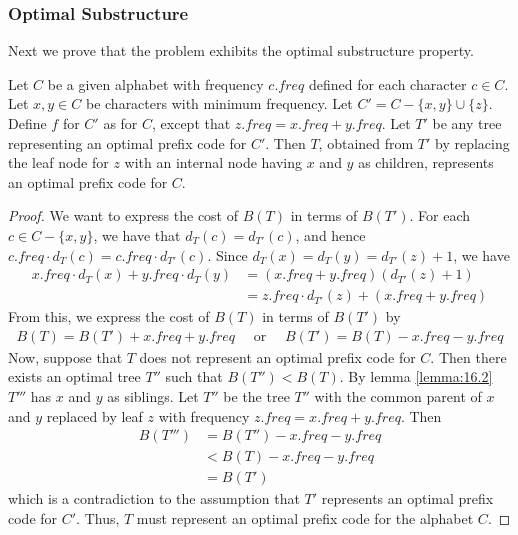 \subsubsection{Optimal Substructure}
Next we prove that the problem exhibits the optimal substructure property.
\begin{lemma} \cite[16.3, p. 435]{clrs}
\textnormal
{
	Let $C$ be a given alphabet with frequency $c.freq$ defined for each
	character $c \in C$. Let $x, y \in C$ be characters with minimum frequency.
	Let $C' = C - \{x, y\} \cup \{z\}$. Define $f$ for $C'$ as for $C$, except
	that $z.freq = x.freq + y.freq$. Let $T'$ be any tree representing an
	optimal prefix code for $C'$. Then $T$, obtained from $T'$ by replacing
	the leaf node for $z$ with an internal node having $x$ and $y$ as children,
	represents an optimal prefix code for $C$.
}
\end{lemma}

\begin{proof}
	We want to express the cost of $B(T)$ in terms of $B(T')$. For each $c \in
	C - \{x, y\}$, we have that $d_T(c) = d_{T'}(c)$, and hence $c.freq \cdot
	d_T(c) = c.freq \cdot d_{T'}(c)$. Since $d_T(x) = d_T(y) = d_{T'}(z) + 1$,
	we have
	\begin{align}
		x.freq \cdot d_T(x) + y.freq \cdot d_T(y)
		&= (x.freq + y.freq)(d_{T'}(z) + 1) \\
		&= z.freq \cdot d_{T'}(z) + (x.freq + y.freq)
	\end{align}
	From this, we express the cost of $B(T)$ in terms of $B(T')$ by
	\begin{align}
		B(T) = B(T') + x.freq + y.freq
		\quad \text{ or } \quad
		B(T') = B(T) - x.freq - y.freq
	\end{align}
	Now, suppose that $T$ does not represent an optimal prefix code for $C$.
	Then there exists an optimal tree $T''$ such that $B(T'') < B(T)$. By
	lemma \ref{lemma:16.2} $T'''$ has $x$ and $y$ as siblings. Let $T''$ be
	the tree $T''$ with the common parent of $x$ and $y$ replaced by leaf $z$
	with frequency $z.freq = x.freq + y.freq$. Then
	\begin{align}
		B(T''') &= B(T'') - x.freq - y.freq \\
		&< B(T) - x.freq - y.freq \\
		&= B(T')
	\end{align}
	which is a contradiction to the assumption that $T'$ represents an optimal
	prefix code for $C'$. Thus, $T$ must represent an optimal prefix code for
	the alphabet $C$.
\end{proof}


